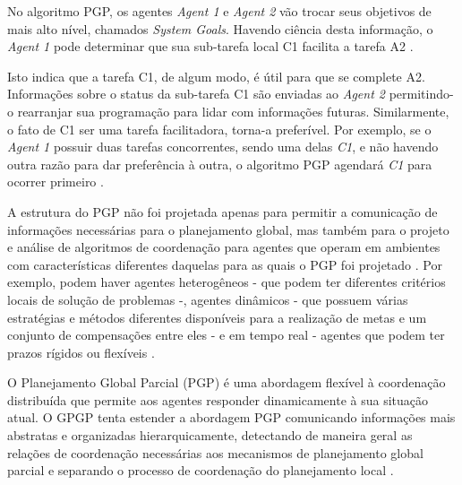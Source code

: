 \begin{description}
    No algoritmo PGP, os agentes \textit{Agent 1} e \textit{Agent 2} vão trocar seus objetivos de mais alto nível, chamados \textit{System Goals}.
    Havendo ciência desta informação, o \textit{Agent 1} pode determinar que sua sub-tarefa local C1 facilita a tarefa A2  \cite{decker1992generalizing}. 
    
    Isto indica que a tarefa C1, de algum modo, é útil para que se complete A2.
    Informações sobre o status da sub-tarefa C1 são enviadas ao \textit{Agent 2} permitindo-o rearranjar sua programação para lidar com informações futuras. Similarmente, o fato de C1 ser uma tarefa facilitadora, torna-a preferível. Por exemplo, se o \textit{Agent 1} possuir duas tarefas concorrentes, sendo uma delas \textit{C1}, e não havendo outra razão para dar preferência à outra, o algoritmo PGP agendará \textit{C1} para ocorrer primeiro  \cite{decker1992generalizing}.
   

A estrutura do PGP não foi projetada apenas para permitir a comunicação de informações necessárias para o planejamento global, mas também para o projeto e análise de algoritmos de coordenação para agentes que operam em ambientes com características diferentes daquelas para as quais o PGP foi projetado . Por exemplo, podem haver agentes heterogêneos - que podem ter diferentes critérios locais de solução de problemas -, agentes dinâmicos - que possuem várias estratégias e métodos diferentes disponíveis para a realização de metas e um conjunto de compensações entre eles - e em tempo real - agentes que podem ter prazos rígidos ou flexíveis \cite{decker1992generalizing}.%


O Planejamento Global Parcial (PGP) é uma abordagem flexível à coordenação distribuída que permite aos agentes responder dinamicamente à sua situação atual. O GPGP tenta estender a abordagem PGP comunicando informações mais abstratas e organizadas hierarquicamente, detectando de maneira geral as relações de coordenação necessárias aos mecanismos de planejamento global parcial e separando o processo de coordenação do planejamento local \cite{decker1992generalizing}.


\end{description}
